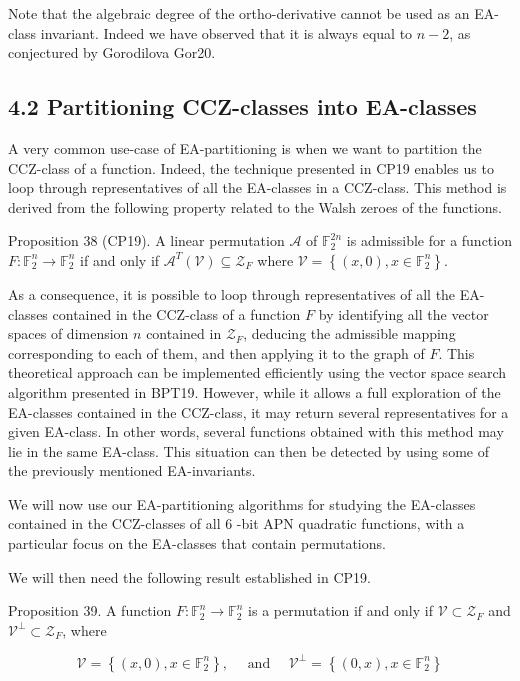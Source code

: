 \documentclass[10pt]{article}
\begin{document}
Note that the algebraic degree of the ortho-derivative cannot be used as an EA-class invariant. Indeed we have observed that it is always equal to $n-2$, as conjectured by Gorodilova Gor20.

\subsection*{4.2 Partitioning CCZ-classes into EA-classes}
A very common use-case of EA-partitioning is when we want to partition the CCZ-class of a function. Indeed, the technique presented in CP19 enables us to loop through representatives of all the EA-classes in a CCZ-class. This method is derived from the following property related to the Walsh zeroes of the functions.

Proposition 38 (CP19). A linear permutation $\mathcal{A}$ of $\mathbb{F}_{2}^{2 n}$ is admissible for a function $F: \mathbb{F}_{2}^{n} \rightarrow \mathbb{F}_{2}^{n}$ if and only if $\mathcal{A}^{T}(\mathcal{V}) \subseteq \mathcal{Z}_{F}$ where $\mathcal{V}=\left\{(x, 0), x \in \mathbb{F}_{2}^{n}\right\}$.

As a consequence, it is possible to loop through representatives of all the EA-classes contained in the CCZ-class of a function $F$ by identifying all the vector spaces of dimension $n$ contained in $\mathcal{Z}_{F}$, deducing the admissible mapping corresponding to each of them, and then applying it to the graph of $F$. This theoretical approach can be implemented efficiently using the vector space search algorithm presented in BPT19. However, while it allows a full exploration of the EA-classes contained in the CCZ-class, it may return several representatives for a given EA-class. In other words, several functions obtained with this method may lie in the same EA-class. This situation can then be detected by using some of the previously mentioned EA-invariants.

We will now use our EA-partitioning algorithms for studying the EA-classes contained in the CCZ-classes of all 6 -bit APN quadratic functions, with a particular focus on the EA-classes that contain permutations.

We will then need the following result established in CP19.

Proposition 39. A function $F: \mathbb{F}_{2}^{n} \rightarrow \mathbb{F}_{2}^{n}$ is a permutation if and only if $\mathcal{V} \subset \mathcal{Z}_{F}$ and $\mathcal{V}^{\perp} \subset \mathcal{Z}_{F}$, where

$$
\mathcal{V}=\left\{(x, 0), x \in \mathbb{F}_{2}^{n}\right\}, \quad \text { and } \quad \mathcal{V}^{\perp}=\left\{(0, x), x \in \mathbb{F}_{2}^{n}\right\}
$$
\end{document}
